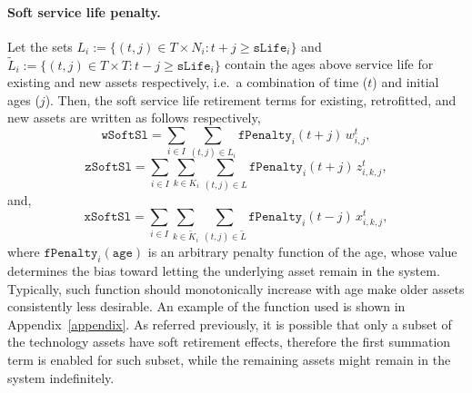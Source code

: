 \documentclass{amsart}
\begin{document}
\paragraph{Soft service life penalty.}
Let the sets 
$L_i:=\{\left(t,j\right)\in T\times N_i:t+j\geq \mathtt{sLife}_i\}$
and $\tilde{L}_i:=\{\left(t,j\right)\in T\times T:t-j\geq \mathtt{sLife}_i\}$
contain the ages above service life for existing and new assets respectively,
i.e.\ a combination of time ($t$) and initial ages ($j$). Then, the soft service
life retirement terms for existing, retrofitted, and new assets are written as
follows respectively,
%
%
%
\begin{equation}
    \mathtt{wSoftSl} = \sum_{i\in I} \sum_{\left(t,j\right)\in L_i} 
    \mathtt{fPenalty}_i \left(t+j\right) \, w^t_{i,j},
\end{equation}
%
\begin{equation}
    \mathtt{zSoftSl} = \sum_{i\in I} 
    \sum_{k \in K_i} \sum_{\left(t,j\right)\in L} 
    \mathtt{fPenalty}_i \left(t+j\right) \, z^t_{i,k,j},
\end{equation}
%
and,
%
\begin{equation}
    \mathtt{xSoftSl} = \sum_{i\in I} 
    \sum_{k \in \tilde{K}_i} \sum_{\left(t,j\right)\in\tilde{L}} 
    \mathtt{fPenalty}_i \left(t-j\right) \, x^t_{i,k,j},
\end{equation}
%
where $\mathtt{fPenalty}_i(\mathtt{age})$ is an arbitrary penalty function of
the age, whose value determines the bias toward letting the underlying asset
remain in the system. Typically, such function should monotonically increase with
age make older assets consistently less desirable. An example of the function
used is shown in Appendix~\ref{appendix}.
As referred previously, it is possible that only a subset of the technology
assets have soft retirement effects, therefore the first summation term is
enabled for such subset, while the remaining assets might remain in the system
indefinitely. 
%
\end{document}

